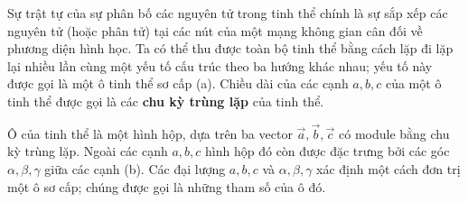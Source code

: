 Sự trật tự của sự phân bố các nguyên tử trong tinh thể chính là sự sắp xếp các nguyên tử (hoặc phân tử) tại các nút của một mạng không gian cân đối về phương diện hình học. Ta có thể thu được toàn bộ tinh thể bằng cách lặp đi lặp lại nhiều lần cùng một yếu tố cấu trúc theo ba hướng khác nhau; yếu tố này được gọi là một ô tinh thể sơ cấp (a). Chiều dài của các cạnh $a, b, c$ của một ô tinh thể được gọi là các \textbf{chu kỳ trùng lặp} của tinh thể.


Ô của tinh thể là một hình hộp, dựa trên ba vector $\vec{a}, \vec{b}, \vec{c}$ có module bằng chu kỳ trùng lặp. Ngoài các cạnh $a, b, c$ hình hộp đó còn được đặc trưng bởi các góc $\alpha, \beta, \gamma$ giữa các cạnh (b). Các đại lượng $a, b, c$ và $\alpha, \beta, \gamma$ xác định một cách đơn trị một ô sơ cấp; chúng được gọi là những tham số của ô đó.

